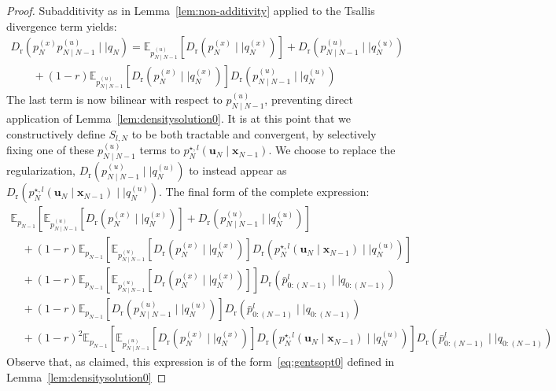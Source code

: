 \documentclass[a4paper,fleqn]{cas-sc}
\newcommand{\E}{\mathbb{E}}
\newcommand{\bv}[1]{\mathbf{#1}}
\newcommand{\Dr}[2]{{D}_{\text{r}}\left(#1\mid \mid #2 \right)}
\newcommand{\shortplant}[1]{p_{{#1}}^{(x)}}
\newcommand{\shortpolicy}[2]{p_{{#1}\mid{#2}}^{(u)}}
\newcommand{\optimalpolicygen}[3]{p^{\star,{#3}}_{{#1}} \left(\bv{u}_{{#1}}\mid \bv{x}_{{#2}} \right)}
\begin{document}
\begin{proof}
Subadditivity as in Lemma~\ref{lem:non-additivity} applied to the Tsallis divergence term yields:
\[
\begin{array}{l}
\Dr{\shortplant{N}\shortpolicy{N}{N-1}}{q_N} = \E_{\shortpolicy{N}{N-1}}\left[\Dr{\shortplant{N}}{q^{(x)}_N}\right]+ \Dr{\shortpolicy{N}{N-1}}{q^{(u)}_N} \\
\qquad + (1-r) \E_{\shortpolicy{N}{N-1}}\left[\Dr{\shortplant{N}}{q^{(x)}_N}\right]\Dr{\shortpolicy{N}{N-1}}{q^{(u)}_N}
\end{array}
\]
The last term is now bilinear with respect to $\shortpolicy{N}{N-1}$, preventing direct application of Lemma~\ref{lem:densitysolution0}. 
It is at this point that we constructively define $S_{l,N}$ to be both tractable and convergent, by selectively fixing one of these $\shortpolicy{N}{N-1}$ terms to $\optimalpolicygen{N}{N-1}{l}$. We choose to replace the regularization, $\Dr{\shortpolicy{N}{N-1}}{q^{(u)}_N}$ to instead appear as $\Dr{\optimalpolicygen{N}{N-1}{l}}{q^{(u)}_N}$. The final form of the complete expression:
\[
\begin{array}{l}
\E_{p_{N-1}}\left[\E_{\shortpolicy{N}{N-1}}\left[\Dr{\shortplant{N}}{q^{(x)}_N}\right]+ \Dr{\shortpolicy{N}{N-1}}{q^{(u)}_N} \right]
\\ \quad +(1-r)\E_{p_{N-1}}\left[ \E_{\shortpolicy{N}{N-1}}\left[\Dr{\shortplant{N}}{q^{(x)}_N}\right]\Dr{\optimalpolicygen{N}{N-1}{l}}{q^{(u)}_N}\right]
\\ \quad +(1-r)\E_{p_{N-1}}\left[\E_{\shortpolicy{N}{N-1}}\left[\Dr{\shortplant{N}}{q^{(x)}_N}\right]\right]\Dr{\bar{p}^{l}_{0:(N-1)}}{q_{0:(N-1)}} 
\\ \quad +(1-r)\E_{p_{N-1}}\left[\Dr{\shortpolicy{N}{N-1}}{q^{(u)}_N}\right]\Dr{\bar{p}^{l}_{0:(N-1)}}{q_{0:(N-1)}} 
\\ \quad +(1-r)^2\E_{p_{N-1}}\left[ \E_{\shortpolicy{N}{N-1}}\left[\Dr{\shortplant{N}}{q^{(x)}_N}\right]\Dr{\optimalpolicygen{N}{N-1}{l}}{q^{(u)}_N}\right]\Dr{\bar{p}^{l}_{0:(N-1)}}{q_{0:(N-1)}} 
\end{array}
\]
Observe that, as claimed, this expression is of the form~\eqref{eq:gentsopt0} defined in Lemma~\ref{lem:densitysolution0}


\end{proof}
\end{document}
